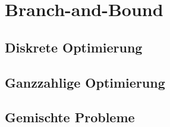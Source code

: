 \chapter{Branch-and-Bound}
\section{Diskrete Optimierung}
\section{Ganzzahlige Optimierung}
\section{Gemischte Probleme}
